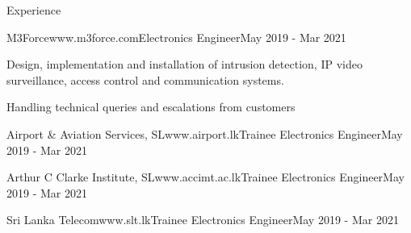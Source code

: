 \documentclass[
	11pt, %
]{./assets/resume} %
\begin{document}
\begin{rSection}{Experience}
	\begin{rSubsectionX}{M3Force}{www.m3force.com}{Electronics Engineer}{May 2019 - Mar 2021}
		\item Design, implementation and installation of intrusion detection, IP video surveillance, access control and communication systems.
		\item Handling technical queries and escalations from customers 
	\end{rSubsectionX}

	\begin{rSubsectionSimpleX}{Airport \& Aviation Services, SL}{www.airport.lk}{Trainee Electronics Engineer}{May 2019 - Mar 2021}
	\end{rSubsectionSimpleX}

	\begin{rSubsectionSimpleX}{Arthur C Clarke Institute, SL}{www.accimt.ac.lk}{Trainee Electronics Engineer}{May 2019 - Mar 2021}
	\end{rSubsectionSimpleX}

	\begin{rSubsectionSimpleX}{Sri Lanka Telecom}{www.slt.lk}{Trainee Electronics Engineer}{May 2019 - Mar 2021}
	\end{rSubsectionSimpleX}


\end{rSection}

\end{document}
